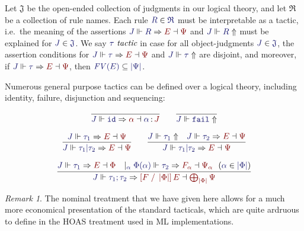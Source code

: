 \documentclass[11pt]{article}
\theoremstyle{definition}
\theoremstyle{remark}
\newtheorem{remark}[thm]{Remark}
\numberwithin{equation}{section}
\def\InputModeColorName{MidnightBlue}
\def\OutputModeColorName{Maroon}
\newcommand\InputMode[1]{{\color{\InputModeColorName}{#1}}}
\newcommand\OutputMode[1]{{\color{\OutputModeColorName}{#1}}}
\newcommand\HypJ[2]{#1\ \ (#2)}
\newcommand\GenJ[2]{\vert_{\InputMode{#1}}\; #2}
\newcommand\JJ{J}
\newcommand\RSet{\mathfrak{R}}
\newcommand\JSet{\mathfrak{J}}
\newcommand\IsTac[1]{\InputMode{#1}\ \textit{tactic}}
\newcommand\SG[2]{\InputMode{#1}\,{\color{Black}:}\,\OutputMode{#2}}
\newcommand\Refine[4]{\InputMode{#1}\Vdash\InputMode{#2}\Rightarrow\OutputMode{#4}\dashv\OutputMode{#3}}
\newcommand\NoRefine[2]{\InputMode{#1}\Vdash\InputMode{#2}\Uparrow}
\newcommand\Member[2]{\InputMode{#1}\in\InputMode{#2}}
\newcommand\IdTac{\mathtt{id}}
\newcommand\FailTac{\mathtt{fail}}
\newcommand\OrElseTac[2]{#1\vert#2}
\newcommand\ThenTac[2]{#1;#2}
\newcommand\Dom[1]{\left\vert#1\right\vert}
\newcommand\SubsetEq[2]{\InputMode{#1}\subseteq\InputMode{#2}}
\newcommand\FV[1]{\textit{FV}\left(#1\right)}
\newcommand\Subst[3]{\left[#1\;/\;#2\right]#3}
\begin{document}
Let $\JSet$ be the open-ended collection of judgments in our logical theory,
and let $\RSet$ be a collection of rule names. Each rule $\Member{R}{\RSet}$
must be interpretable as a tactic, i.e.\ the meaning of the assertions
$\Refine{\JJ}{R}{\Psi}{E}$ and $\NoRefine{\JJ}{R}$ must be explained for
$\Member{J}{\JSet}$. We say $\IsTac{\tau}$ in case for all object-judgments
$\Member{\JJ}{\JSet}$, the assertion conditions for
$\Refine{\JJ}{\tau}{\Psi}{E}$ and $\NoRefine{\JJ}{\tau}$ are disjoint, and
moreover, if $\Refine{\JJ}{\tau}{\Psi}{E}$, then
$\SubsetEq{\FV{E}}{\Dom{\Psi}}$.

Numerous general purpose tactics can be defined over a logical theory,
including identity, failure, disjunction and sequencing:

\begin{gather*}
  \infer{
    \Refine{\JJ}{\IdTac}{\SG{\alpha}{\JJ}}{\alpha}
  }{
  }
  \qquad
  \infer{
    \NoRefine{\JJ}{\FailTac}
  }{
  }\\[6pt]
  \infer{
    \Refine{\JJ}{\OrElseTac{\tau_1}{\tau_2}}{\Psi}{E}
  }{
    \Refine{\JJ}{\tau_1}{\Psi}{E}
  }
  \qquad
  \infer{
    \Refine{\JJ}{\OrElseTac{\tau_1}{\tau_2}}{\Psi}{E}
  }{
    \NoRefine{\JJ}{\tau_1} &
    \Refine{\JJ}{\tau_2}{\Psi}{E}
  }\\[6pt]
  \infer{
    \Refine{\JJ}{\ThenTac{\tau_1}{\tau_2}}{\bigoplus_{\Dom\Phi}\Psi}{\Subst{F}{\Dom\Phi}{E}}
  }{
    \Refine{\JJ}{\tau_1}{\Phi}{E} &
    \GenJ{\alpha}{
      \HypJ{
        \Refine{\Phi(\alpha)}{\tau_2}{\Psi_\alpha}{F_\alpha}
      }{
        \Member{\alpha}{\Dom\Phi}
      }
    }
  }
\end{gather*}

\begin{remark}
  The nominal treatment that we have given here allows for a much more
  economical presentation of the standard tacticals, which are quite ardruous
  to define in the HOAS treatment used in ML implementations.
\end{remark}
\end{document}

